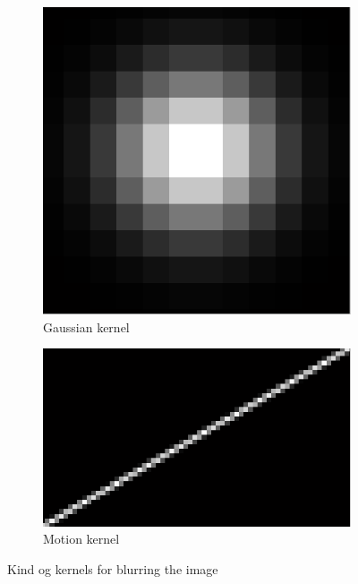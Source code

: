 \documentclass[a4paper, 10pt, conference] {article}
\begin{document}
\begin{figure}[H]
 	\centering
 	\begin{subfigure}{0.49\textwidth} 
 		\centering						
 		\includegraphics[scale=0.3]{gaussian/no_noise/kernel_sigma2.PNG}
		\caption{Gaussian kernel}
	\end{subfigure}
	\begin{subfigure}{0.49\textwidth}
		\centering
		\includegraphics[scale=0.3]{motion/kernel_alpha30.PNG}
		\caption{Motion kernel}
	\end{subfigure}
	\caption{Kind og kernels for blurring the image}
	\label{kern}
\end{figure}
\end{document}
